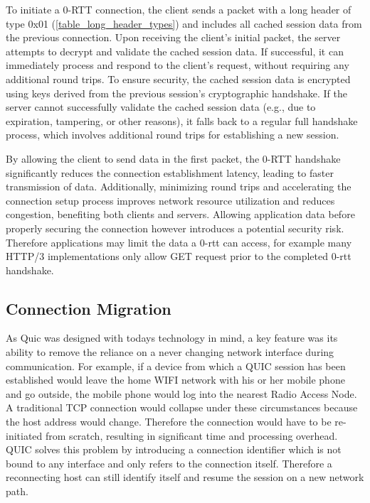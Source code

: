 To initiate a 0-RTT connection, the client sends a packet with a long header of type 0x01 (\ref{table_long_header_types}) and
includes all cached session data from the previous connection. Upon receiving the client's initial packet, the server attempts
to decrypt and validate the cached session data. If successful, it can immediately process and respond to the client's request,
without requiring any additional round trips. To ensure security, the cached session data is encrypted using keys derived from
the previous session's cryptographic handshake. If the server cannot successfully validate the cached session data (e.g., due to
expiration, tampering, or other reasons), it falls back to a regular full handshake process, which involves additional round
trips for establishing a new session.

By allowing the client to send data in the first packet, the 0-RTT handshake significantly reduces the connection establishment
latency, leading to faster transmission of data. Additionally, minimizing round trips and accelerating the connection setup process
improves network resource utilization and reduces congestion, benefiting both clients and servers. Allowing application data before
properly securing the connection however introduces a potential security risk. Therefore applications may limit the data a 0-rtt can
access, for example many HTTP/3 implementations only allow GET request prior to the completed 0-rtt handshake.

\subsection{Connection Migration} \label{connection_migration}

As Quic was designed with todays technology in mind, a key feature was its ability to remove the reliance on a never changing network
interface during communication. For example, if a device from which a QUIC session has been established would leave the home WIFI
network with his or her mobile phone and go outside, the mobile phone would log into the nearest Radio Access Node. A traditional TCP
connection would collapse under these circumstances because the host address would change.
Therefore the connection would have to be re-initiated from scratch, resulting in significant time and processing overhead. QUIC
solves this problem by introducing a connection identifier which is not bound to any interface and only refers to the connection
itself. Therefore a reconnecting host can still identify itself and resume the session on a new network path.

